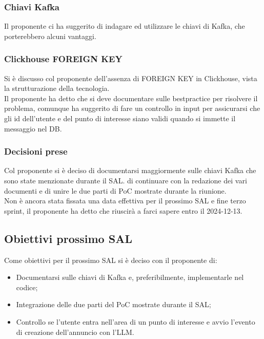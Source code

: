 \documentclass[12pt]{article}
\begin{document}
\subsubsection{Chiavi Kafka}
Il proponente ci ha suggerito di indagare ed utilizzare le chiavi di Kafka, che porterebbero alcuni vantaggi.

\subsubsection{Clickhouse FOREIGN KEY}
Si è discusso col proponente dell'assenza di FOREIGN KEY in Clickhouse, vista la strutturazione della tecnologia.\\
Il proponente ha detto che si deve documentare sulle bestpractice per risolvere il problema, comunque ha suggerito di fare un controllo in input per assicurarsi che gli id dell'utente e del punto di interesse siano validi quando si immette il messaggio nel DB.

\subsubsection{Decisioni prese}
Col proponente si è deciso di documentarsi maggiormente sulle chiavi Kafka che sono state menzionate durante il SAL. di continuare con la redazione dei vari documenti e di unire le due parti di PoC mostrate durante la riunione.\\
Non è ancora stata fissata una data effettiva per il prossimo SAL e fine terzo sprint, il proponente ha detto che riuscirà a farci sapere entro il 2024-12-13.
\newpage
\subsection{Obiettivi prossimo SAL}
Come obiettivi per il prossimo SAL si è deciso con il proponente di:
\begin{itemize}
\item Documentarsi sulle chiavi di Kafka e, preferibilmente, implementarle nel codice;
\item Integrazione delle due parti del PoC mostrate durante il SAL;
  \item Controllo se l'utente entra nell'area di un punto di interesse e avvio l'evento di creazione dell'annuncio con l'LLM.
\end{itemize}
\end{document}
